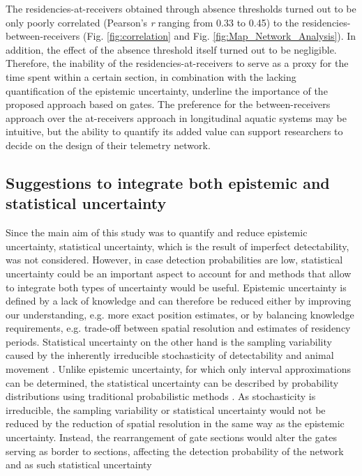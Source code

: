 \documentclass[preprint,12pt,authoryear]{elsarticle}
\begin{document}
\begin{spacing}{1.9}
The residencies-at-receivers obtained through absence thresholds turned out to be only poorly correlated (Pearson's \textit{r} ranging from 0.33 to 0.45) to the residencies-between-receivers (Fig. \ref{fig:correlation} and Fig. \ref{fig:Map_Network_Analysis}). In addition, the effect of the absence threshold itself turned out to be negligible. Therefore, the inability of the residencies-at-receivers to serve as a proxy for the time spent within a certain section, in combination with the lacking quantification of the epistemic uncertainty, underline the importance of the proposed approach based on gates. The preference for the between-receivers approach over the at-receivers approach in longitudinal aquatic systems may be intuitive, but the ability to quantify its added value can support researchers to decide on the design of their telemetry network. 

\subsection{Suggestions to integrate both epistemic and statistical uncertainty}

Since the main aim of this study was to quantify and reduce epistemic uncertainty, statistical uncertainty, which is the result of imperfect detectability, was not considered. However, in case detection probabilities are low, statistical uncertainty could be an important aspect to account for and methods that allow to integrate both types of uncertainty would be useful. Epistemic uncertainty is defined by a lack of knowledge and can therefore be reduced either by improving our understanding, e.g. more exact position estimates, or by balancing knowledge requirements, e.g. trade-off between spatial resolution and estimates of residency periods. Statistical uncertainty on the other hand is the sampling variability caused by the inherently irreducible stochasticity of detectability and animal movement \citep{Fox2011DistinguishingUncertainty}. Unlike epistemic uncertainty, for which only interval approximations can be determined, the statistical uncertainty can be described by probability distributions using traditional probabilistic methods \citep{Eldred2009EfficientElectronics}. As stochasticity is irreducible, the sampling variability or statistical uncertainty would not be reduced by the reduction of spatial resolution in the same way as the epistemic uncertainty. Instead, the rearrangement of gate sections would alter the gates serving as border to sections, affecting the detection probability of the network and as such statistical uncertainty


\end{spacing}
\end{document}

